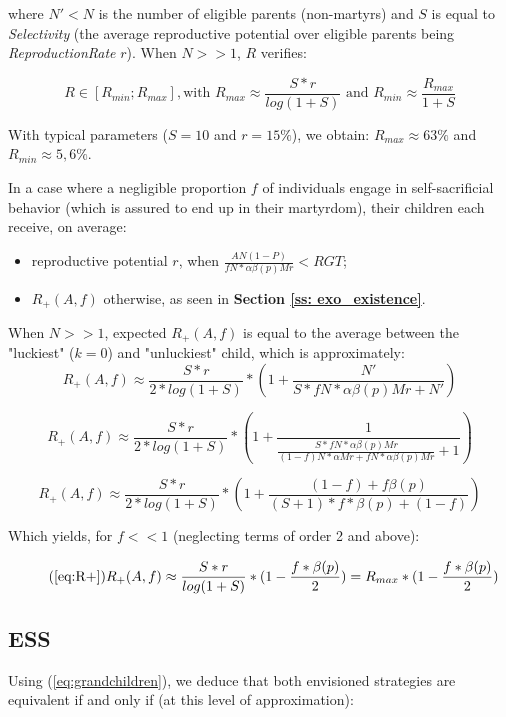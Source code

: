 \documentclass[a4paper,12pt]{report}
\begin{document}
where $N'<N$ is the number of eligible parents (non-martyrs) and $S$ is equal to \emph{Selectivity}
(the average reproductive potential over eligible parents being \emph{ReproductionRate} $r$).
When $N >> 1$, $R$ verifies:

\begin{equation}
    R \in [R_{min};R_{max}], \textrm{with } R_{max} \approx \frac{S*r}{log(1+S)} 
    \textrm{ and } R_{min} \approx
    \frac{R_{max}}{1+S}
\label{eq:ReproPot}
\end{equation}

With typical parameters ($S=10$ and $r=15\%$), we obtain: $R_{max} \approx 63 \%$ and 
$R_{min} \approx 5,6 \%$.

In a case where a negligible proportion $f$ of individuals engage in
self-sacrificial behavior (which is assured to end up in their martyrdom), their children each
receive, on average:
\begin{itemize}
\item reproductive potential $r$, when $\frac{AN(1-P)}{fN*\alpha\beta(p)Mr} < RGT$;
\item $R_{+}(A,f)$ otherwise, as seen in \textbf{Section \ref{ss: exo_existence}}.
\end{itemize}

When $N>>1$, expected $R_+(A,f)$ is equal to the average between the "luckiest" ($k=0$) and "unluckiest"
child, which is approximately:
\[ R_+(A,f) \approx \frac{S*r}{2*log(1+S)} * (1 + \frac{N'}{S*fN*\alpha\beta(p)Mr+N'})\]

\[ R_+(A,f) \approx \frac{S*r}{2*log(1+S)} * (1 + \frac{1}{\frac{S*fN*\alpha\beta(p)Mr}{(1-f)N*\alpha Mr + fN*\alpha\beta(p)Mr}+1})\]

\[ R_+(A,f) \approx \frac{S*r}{2*log(1+S)} * (1 + \frac{(1-f) + f\beta(p)}{(S+1)*f*\beta(p)+(1-f)})\]

Which yields, for $f<<1$ (neglecting terms of order 2 and above):

\begin{equation}
    \tag{\ref{eq:R+}}
    R_+(A,f) \approx  \frac{S*r}{log(1+S)} * (1 - \frac{f*\beta(p)}{2}) = R_{max}*(1-\frac{f*\beta(p)}{2})
\end{equation}

\subsection{ESS}
\label{ss_e_a:ESS}

Using (\ref{eq:grandchildren}), we deduce that both envisioned strategies are equivalent if
and only if (at this level of approximation):
\end{document}
